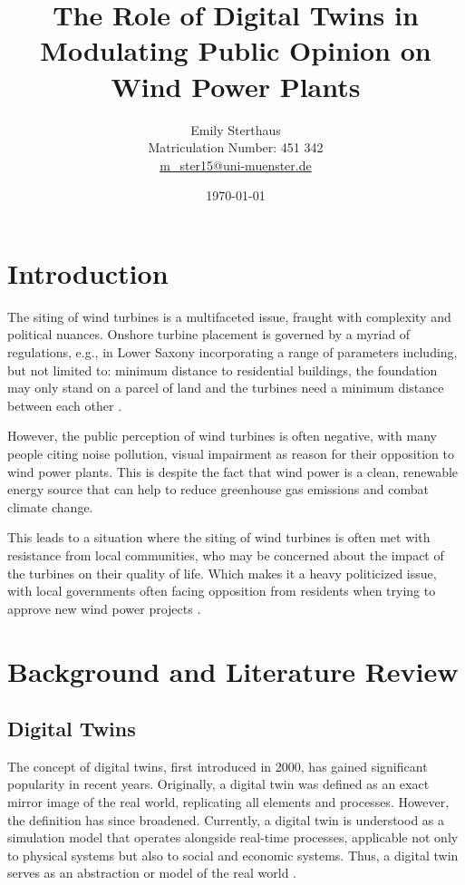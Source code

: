 \documentclass[11pt, titlepage, a4paper]{scrartcl}
\title{The Role of Digital Twins in Modulating Public Opinion on Wind Power Plants}
\author{Emily Sterthaus \\ Matriculation Number: 451 342 \\ \href{mailto:m_ster15@uni-muenster.de}{m\_ster15@uni-muenster.de}}
\affil{Institute of Geoinformatics, University of Münster}
\date{\today}
\begin{document}
\maketitle


\newpage
\tableofcontents
\newpage
\begin{linenumbers}
\section{Introduction}
The siting of wind turbines is a multifaceted issue, fraught with complexity and political nuances. Onshore
turbine placement is governed by a myriad of regulations, e.g., in Lower Saxony incorporating a range of parameters including, but not
limited to: minimum distance to residential buildings, the foundation may only stand on a parcel of land and the
turbines need a minimum distance between each other
\cite{niedersachsischesministeriumfurumweltenergieundklimaschutzPlanungUndGenehmigung2021}.

However, the public perception of wind turbines is often negative, with many people citing noise pollution, visual impairment as reason for their opposition to wind power plants. This is despite the fact that wind power is a clean, renewable energy source that can help to reduce greenhouse gas emissions and combat climate change.

This leads to a situation where the siting of wind turbines is often met with resistance from local communities, who may be concerned about the impact of the turbines on their quality of life. Which makes it a heavy politicized issue, with local governments often facing opposition from residents when trying to approve new wind power projects \cite{kwasniewskiWindenergieVerhindertAntiWindkraftBewegung2021}.

\section{Background and Literature Review}
\subsection{Digital Twins}
The concept of digital twins, first introduced in 2000, has gained significant popularity in recent years. Originally, a digital twin was defined as an exact mirror image of the real world, replicating all elements and processes. However, the definition has since broadened. Currently, a digital twin is understood as a simulation model that operates alongside real-time processes, applicable not only to physical systems but also to social and economic systems. Thus, a digital twin serves as an abstraction or model of the real world \cite{battyDigitalTwins2018}.


\end{linenumbers}
\end{document}
